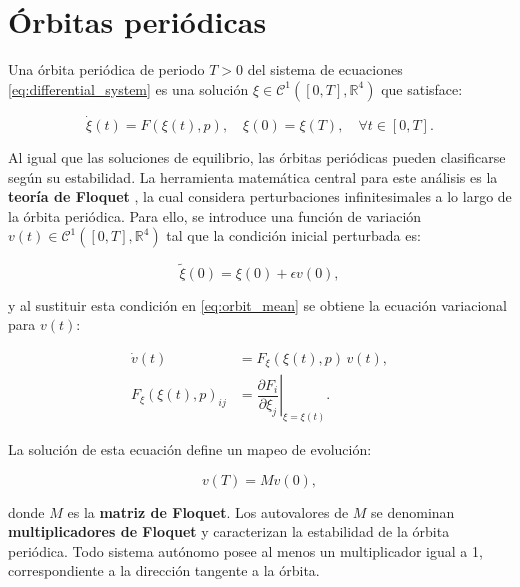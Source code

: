 \section{Órbitas periódicas}

Una órbita periódica de periodo $T > 0$ del sistema de ecuaciones \eqref{eq:differential_system} es una solución
$\xi \in \mathcal{C}^1([0,T], \mathbb{R}^4)$ que satisface:

\begin{equation}
    \dot{\xi}(t) = F(\xi(t), p), \quad \xi(0) = \xi(T), \quad \forall t \in [0,T].
    \label{eq:orbit_mean}
\end{equation}

Al igual que las soluciones de equilibrio, las órbitas periódicas pueden clasificarse según su estabilidad.
La herramienta matemática central para este análisis es la \textbf{teoría de Floquet} \cite{meyer1992introduction}, la cual considera
perturbaciones infinitesimales a lo largo de la órbita periódica. Para ello, se introduce una función de
variación $v(t) \in \mathcal{C}^1([0,T], \mathbb{R}^4)$ tal que la condición inicial perturbada es:

\begin{equation}
    \tilde{\xi}(0) = \xi(0) + \epsilon v(0),
    \label{eq:variationalorbit}
\end{equation}

\noindent y al sustituir esta condición en \eqref{eq:orbit_mean} se obtiene la ecuación variacional para $v(t)$:

\begin{equation}
    \begin{split}
        \dot{v}(t)              & = F_{\xi}(\xi(t), p)\, v(t),                                              \\
        F_{\xi}(\xi(t), p)_{ij} & = \left. \dfrac{\partial F_{i}}{\partial \xi_{j}} \right|_{\xi = \xi(t)}.
    \end{split}
    \label{eq:variationaequation}
\end{equation}

La solución de esta ecuación define un mapeo de evolución:

\begin{equation}
    v(T) = M v(0),
    \label{eq:floquetmatrix}
\end{equation}

\noindent donde $M$ es la \textbf{matriz de Floquet}. Los autovalores de $M$ se denominan \textbf{multiplicadores de Floquet}
y caracterizan la estabilidad de la órbita periódica. Todo sistema autónomo posee al menos un
multiplicador igual a 1, correspondiente a la dirección tangente a la órbita.

